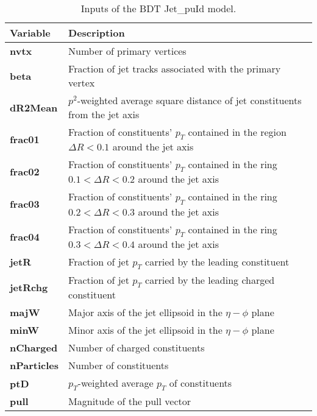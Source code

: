 \begin{minipage}{\linewidth}
\begin{minipage}{0.55\linewidth}
        \begin{table}[H]
        \centering
        \fontsize{9.2pt}{9.2pt}\selectfont
        \begin{tabular}{|l|p{6cm}|}
        \hline
        \textbf{Variable} & \textbf{Description} \\
        \hline
        \textbf{nvtx} & Number of primary vertices \\
        \hline
        \textbf{beta} & Fraction of jet tracks associated with the primary vertex \\
        \hline
        \textbf{dR2Mean} & $p^2$-weighted average square distance of jet constituents from the jet axis \\
        \hline
        \textbf{frac01} & Fraction of constituents' $p_T$ contained in the region $\Delta R < 0.1$ around the jet axis \\
        \hline
        \textbf{frac02} & Fraction of constituents' $p_T$ contained in the ring $0.1 < \Delta R < 0.2$ around the jet axis \\
        \hline
        \textbf{frac03} & Fraction of constituents' $p_T$ contained in the ring $0.2 < \Delta R < 0.3$ around the jet axis \\
        \hline
        \textbf{frac04} & Fraction of constituents' $p_T$ contained in the ring $0.3 < \Delta R < 0.4$ around the jet axis \\
        \hline
        \textbf{jetR} & Fraction of jet $p_T$ carried by the leading constituent \\
        \hline
        \textbf{jetRchg} & Fraction of jet $p_T$ carried by the leading charged constituent \\
        \hline
        \textbf{majW} & Major axis of the jet ellipsoid in the $\eta - \phi$ plane \\
        \hline
        \textbf{minW} & Minor axis of the jet ellipsoid in the $\eta - \phi$ plane \\
        \hline
        \textbf{nCharged} & Number of charged constituents \\
        \hline
        \textbf{nParticles} & Number of constituents \\
        \hline
        \textbf{ptD} & $p_T$-weighted average $p_T$ of constituents \\
        \hline
        \textbf{pull} & Magnitude of the pull vector \\
        \hline
        \end{tabular}
        \caption{Inputs of the BDT Jet\_puId model.}
        \label{tab:puId_inputs}
        \end{table}
        
    \end{minipage}
    
\end{minipage}




